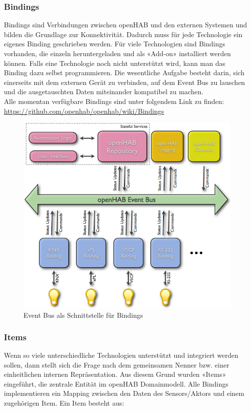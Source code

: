 \subsubsection{Bindings}
Bindings sind Verbindungen zwischen openHAB und den externen Systemen und bilden die Grundlage zur Konnektivität. Dadurch muss für jede Technologie ein eigenes Binding geschrieben werden. Für viele Technologien sind Bindings vorhanden, die einzeln heruntergeladen und als «Add-on» installiert werden können. Falls eine Technologie noch nicht unterstützt wird, kann man das Binding dazu selbst programmieren. Die wesentliche Aufgabe besteht darin, sich einerseits mit dem externen Gerät zu verbinden, auf dem Event Bus zu lauschen und die ausgetauschten Daten miteinander kompatibel zu machen. \\
Alle momentan verfügbare Bindings sind unter folgendem Link zu finden: \url{https://github.com/openhab/openhab/wiki/Bindings}

\begin{figure}[H]
	\centering
		\includegraphics[scale=0.4]{report/img/communicationOH}
	\caption{Event Bus als Schnittstelle für Bindings}
	\label{fig:ohComm}
\end{figure}



\subsubsection{Items}
Wenn so viele unterschiedliche Technologien unterstützt und integriert werden sollen, dann stellt sich die Frage nach dem gemeinsamen Nenner bzw. einer einheitlichen internen Repräsentation. Aus diesem Grund wurden «Items» eingeführt, die zentrale Entität im openHAB Domainmodell. Alle Bindings implementieren ein Mapping zwischen den Daten des Sensors/Aktors und einem zugehörigen Item. Ein Item besteht aus:

